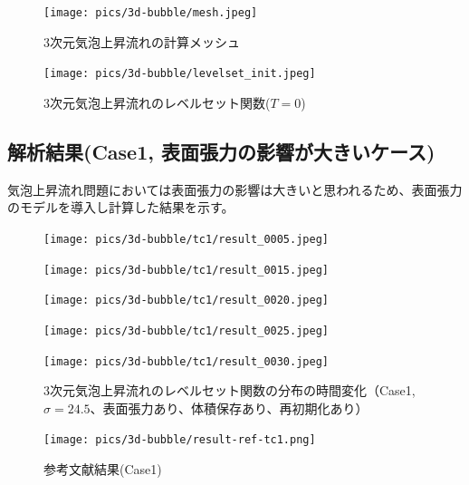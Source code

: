 \begin{figure}[H]
	\centering
	\begin{minipage}[b]{0.49\columnwidth}
	    \centering
	    \texttt{[image: pics/3d-bubble/mesh.jpeg]}
		\caption{3次元気泡上昇流れの計算メッシュ}
		\label{fig:3d-bubble-mesh}
	\end{minipage}
	\begin{minipage}[b]{0.49\columnwidth}
	    \centering
	    \texttt{[image: pics/3d-bubble/levelset\_init.jpeg]}
		\caption{3次元気泡上昇流れのレベルセット関数($T=0$)}
		\label{fig:3d-bubble-levelset_t0_3d}
	\end{minipage}
\end{figure}

\newpage
\subsection{解析結果(Case1, 表面張力の影響が大きいケース)}
気泡上昇流れ問題においては表面張力の影響は大きいと思われるため、表面張力のモデルを導入し計算した結果を示す。

\begin{figure}[H]
	\centering
	\begin{minipage}[b]{0.16\columnwidth}
	    \centering
	    \texttt{[image: pics/3d-bubble/tc1/result\_0005.jpeg]}
	\end{minipage}
	\begin{minipage}[b]{0.16\columnwidth}
	    \centering
	    \texttt{[image: pics/3d-bubble/tc1/result\_0015.jpeg]}
	\end{minipage}
	\begin{minipage}[b]{0.16\columnwidth}
	    \centering
	    \texttt{[image: pics/3d-bubble/tc1/result\_0020.jpeg]}
	\end{minipage}
	\begin{minipage}[b]{0.16\columnwidth}
	    \centering
	    \texttt{[image: pics/3d-bubble/tc1/result\_0025.jpeg]}
	\end{minipage}
	\begin{minipage}[b]{0.16\columnwidth}
	    \centering
	    \texttt{[image: pics/3d-bubble/tc1/result\_0030.jpeg]}
	\end{minipage}

	\caption{3次元気泡上昇流れのレベルセット関数の分布の時間変化（Case1, $\sigma=24.5$、表面張力あり、体積保存あり、再初期化あり）}
	\label{fig:3d-bubble_result_tc1}
\end{figure}

\begin{figure}[H]
    \centering
	\texttt{[image: pics/3d-bubble/result-ref-tc1.png]}
	\caption{参考文献結果(Case1)\cite{Safi2017}}
	\label{fig:3d-bubble-result-ref}
\end{figure}

